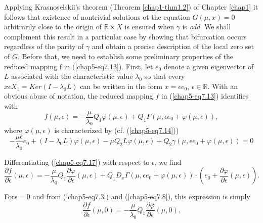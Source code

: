 Applying Krasnoselskii's theorem (Theorem \ref{chap1-thm1.2}) of
Chapter \ref{chap1} it follows that existence of nontrivial solutions
ot the equation $G(\mu, x) = 0$ arbitrarily close to the origin of
$\mathbb{R} \times X$ is ensured when $\gamma$ is {\em odd}. We shall
complement this result in a particular case by showing that
bifurcation occurs regardless of the parity of $\gamma$ and obtain a
precise description of the local zero set of $G$. Before that, we need
to establish some preliminary properties of the reduced mapping f in
(\ref{chap5-eq7.13}). First, let $e_{0}$ denote a given eigenvector of
$L$ associated with the characteristic value $\lambda_{0}$ so that every
$x \epsilon X_{1} = Ker (I - \lambda_{0}L)$ can be written in the form
$x = \epsilon e_{0}$, $\epsilon \in \mathbb{R}$. With an obvious
abuse of notation, the reduced mapping $f$ in (\ref{chap5-eq7.13})
identifies with
\begin{equation*}
f(\mu, \epsilon) = - \frac{\mu}{\lambda_{0}} Q_{1}\varphi(\mu,
\epsilon) + Q_{1}\Gamma(\mu, \epsilon e_{0} + \varphi(\mu,
\epsilon)),\tag{7.17}\label{chap5-eq7.17} 
\end{equation*}
where $\varphi(\mu, \epsilon)$ is characterized by
(cf. (\ref{chap5-eq7.14}))
\begin{equation*}
-\frac{\mu \epsilon}{\lambda_{0}} e_{0} + (I -
\lambda_{0}L)\varphi(\mu, \epsilon) - \mu Q_{2}L\varphi(\mu, \epsilon)
+ Q_{2}\gamma(\mu, \epsilon e_{0} + \varphi(\mu, \epsilon)) =
0\tag{7.18}\label{chap5-eq7.18} 
\end{equation*}

Differentiating (\ref{chap5-eq7.17}) with respect to $\epsilon$, we
find
\begin{equation*}
\frac{\partial f}{\partial \epsilon} (\mu, \epsilon) =
-\frac{\mu}{\lambda_{0}} Q_{1} \frac{\partial \varphi}{\partial
  \epsilon} (\mu, \epsilon) + Q_{1} D_{x} \Gamma(\mu, \epsilon e_{0} +
\varphi(\mu, \epsilon)) \cdot (e_{0} + \frac{\partial
  \varphi}{\partial \epsilon} (\mu, \epsilon)).\tag{7.19}\label{chap5-eq7.19}
\end{equation*}

For\pageoriginale $\epsilon = 0$ and from (\ref{chap5-eq7.3}) and
(\ref{chap5-eq7.8}), this expression is simply 
\begin{equation*}
\frac{\partial f}{\partial \epsilon} (\mu, 0) =
-\frac{\mu}{\lambda_{0}} Q_{1} \frac{\partial \varphi}{\partial
  \epsilon} (\mu, 0).\tag{7.20}\label{chap5-eq7.20}
\end{equation*}

